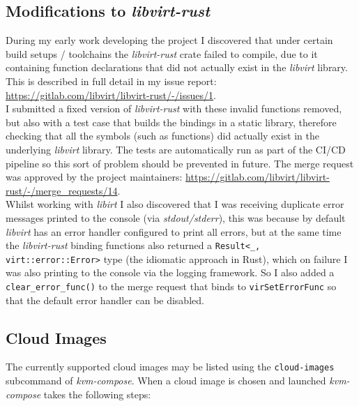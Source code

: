 \documentclass[
    author={Jacob Daniel Halsey},
    supervisor={Prof. Awais Rashid},
    degree={BSc},
    title={Building a Testbed for Evaluating Privacy Enhancing Technologies  (PETs)},
    subtitle={},
    type={software development},
    year={2021}
]{dissertation}
\begin{document}
\subsection{Modifications to \emph{libvirt-rust}}

During my early work developing the project I discovered that under certain build setups / toolchains
the \emph{libvirt-rust} crate
failed to compile, due to it containing function declarations that did not actually exist in the \emph{libvirt}
library. This is described in full detail in my issue
report: \url{https://gitlab.com/libvirt/libvirt-rust/-/issues/1}.\\

I submitted a fixed version of \emph{libvirt-rust} with these invalid functions removed, but also with
a test case that builds the bindings in a static library, therefore checking that all the symbols (such as
functions) did actually exist in the underlying \emph{libvirt} library. 
The tests are automatically run as part of the 
CI/CD pipeline so this sort of problem should be prevented in future. The merge request was approved by
the project maintainers: \url{https://gitlab.com/libvirt/libvirt-rust/-/merge_requests/14}. \\

Whilst working with \emph{libirt} I also discovered that I was receiving duplicate error messages printed
to the console (via \emph{stdout/stderr}), this was because by default \emph{libvirt} has an error handler
configured to print all errors, but at the same time the \emph{libvirt-rust} binding functions also returned
a \lstinline|Result<_, virt::error::Error>| type (the idiomatic approach in Rust), 
which on failure I was also printing to the console
via the logging framework. So I also added a \lstinline|clear_error_func()| to the merge request
that binds to \lstinline|virSetErrorFunc| so that the default error handler can be disabled.

\subsection{Cloud Images}

The currently supported cloud images may be listed using the \texttt{cloud-images} subcommand 
of \emph{kvm-compose}. When a cloud image is chosen and launched \emph{kvm-compose} takes the following
steps:
\end{document}
